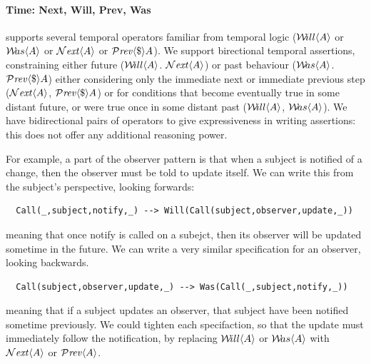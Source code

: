 \paragraph{Time: Next, Will, Prev, Was}

\Chainmail supports several temporal operators familiar from temporal
logic (${{\mathcal W}\!ill}\langle A\rangle$ or ${{\mathcal W}\!as}\langle A\rangle$ or ${\mathcal{N}}\textrm{\textit{ext}}\langle A\rangle$ or ${\mathcal{P}}\textrm{\textit{rev}}\langle \$\rangle A$). 
We support birectional temporal
assertions, constraining either future (${{\mathcal W}\!ill}\langle A\rangle$. ${\mathcal{N}}\textrm{\textit{ext}}\langle A\rangle$)
or past behaviour (${{\mathcal W}\!as}\langle A\rangle$.  ${\mathcal{P}}\textrm{\textit{rev}}\langle \$\rangle A$) either considering only
the  immediate next or immediate previous step (${\mathcal{N}}\textrm{\textit{ext}}\langle A\rangle$,
${\mathcal{P}}\textrm{\textit{rev}}\langle \$\rangle A$) or for conditions that become eventually true in some
distant future, or were true once in some distant past  
(${{\mathcal W}\!ill}\langle A\rangle$, ${{\mathcal W}\!as}\langle A\rangle$). We have bidirectional pairs of operators
to give expressiveness in writing assertions: this does not offer any
additional reasoning power. 

For example, a part of the observer pattern is that when
a subject is notified of a change, then the observer must
be told to update itself.    We can write this from the
subject's perspective, looking forwards:

\begin{lstlisting}
  Call(_,subject,notify,_) --> Will(Call(subject,observer,update,_))
\end{lstlisting}

\noindent meaning that once notify is called on a subejct, then its
observer will be updated sometime in the future.  We can write a very
similar specification for an observer, looking backwards.

\begin{lstlisting}
  Call(subject,observer,update,_) --> Was(Call(_,subject,notify,_))
\end{lstlisting}

\noindent meaning that if a subject updates an observer, that subject
have been notified sometime previously. We could tighten each
specifaction, so that the update must immediately follow the
notification, by replacing ${{\mathcal W}\!ill}\langle A\rangle$ or ${{\mathcal W}\!as}\langle A\rangle$ with 
${\mathcal{N}}\textrm{\textit{ext}}\langle A\rangle$ or ${\mathcal{P}}\textrm{\textit{rev}}\langle A\rangle$.

{}


{}
